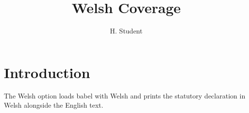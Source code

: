 \documentclass[phd,welsh,12pt,a4paper]{bangorthesis}
\title{Welsh Coverage}
\author{H. Student}
\begin{document}
\maketitle
\statementspage
\chapter{Introduction}
The Welsh option loads babel with Welsh and prints the statutory
declaration in Welsh alongside the English text.
\end{document}
